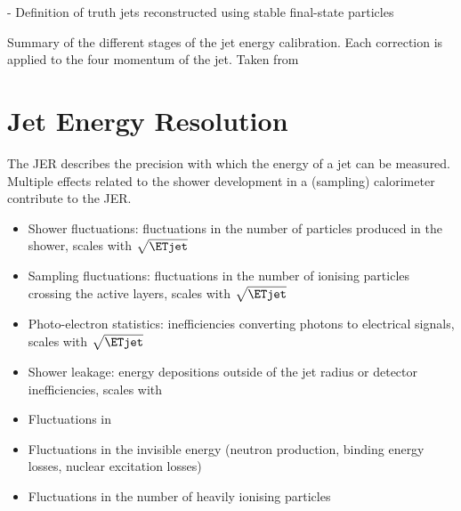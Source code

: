 
- Definition of truth jets reconstructed using stable final-state particles


\begin{table}
    \caption{Summary of the different stages of the jet energy calibration. Each correction is applied to the four momentum of the jet. Taken from }
    \label{tab:jes-calibration}
\end{table}


\section{Jet Energy Resolution}
The JER describes the precision with which the energy of a jet can be measured.
Multiple effects related to the shower development in a (sampling) calorimeter contribute to the JER.


\begin{itemize}
    \item Shower fluctuations: fluctuations in the number of particles produced in the shower, scales with $\sqrt{\ETjet}$
    \item Sampling fluctuations: fluctuations in the number of ionising particles crossing the active layers, scales with $\sqrt{\ETjet}$
    \item Photo-electron statistics: inefficiencies converting photons to electrical signals, scales with $\sqrt{\ETjet}$
    \item Shower leakage: energy depositions outside of the jet radius or detector inefficiencies, scales with \ETjet
    \item Fluctuations in \fEM
    \item Fluctuations in the invisible energy (neutron production, binding energy losses, nuclear excitation losses)
    \item Fluctuations in the number of heavily ionising particles
\end{itemize}

